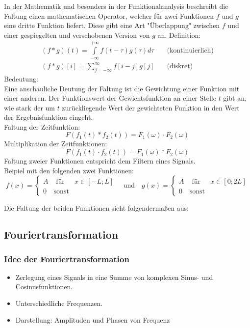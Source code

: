 In der Mathematik und besonders in der Funktionalanalysis beschreibt die Faltung einen mathematischen Operator, welcher für zwei Funktionen $f$ und $g$ eine dritte Funktion liefert. Diese gibt eine Art "{}Überlappung"{} zwischen $f$ und einer gespiegelten und verschobenen Version von $g$ an.
Definition: $$\begin{array}{cl} (f * g)(t) = \int\limits_{- \infty}^{+ \infty} f(t - \tau) g(\tau) d \tau & \quad \textrm{(kontinuierlich)} \\ (f * g)[i] = \sum\limits_{j = - \infty}^{\infty} f[i - j] g[j] & \quad \textrm{(diskret)} \end{array}$$
Bedeutung: \\
Eine anschauliche Deutung der Faltung ist die Gewichtung einer Funktion mit einer anderen. Der Funktionswert der Gewichtsfunktion an einer Stelle $t$ gibt an, wie stark der um $t$ zurückliegende Wert der gewichteten Funktion in den Wert der Ergebnisfunktion eingeht. \\
Faltung der Zeitfunktion: $$F(f_1(t) * f_2(t)) = F_1(\omega) \cdot F_2(\omega)$$
Multiplikation der Zeitfunktionen: $$F(f_1(t) \cdot f_2(t)) = F_1(\omega) * F_2(\omega)$$
Faltung zweier Funktionen entspricht dem Filtern eines Signals. \\[0,1cm]
Beipiel mit den folgenden zwei Funktionen:
$$f(x) = \left\{ \begin{array}{ccc} A & \textrm{ für } & x \in [-L;L] \\ 0 & \textrm{sonst} & \end{array} \right. \quad \textrm{und} \quad g(x) = \left\{ \begin{array}{ccc} A & \textrm{ für } & x \in [0;2L] \\ 0 & \textrm{sonst} & \end{array} \right.$$


Die Faltung der beiden Funktionen sieht folgendermaßen aus:


\subsection{Fouriertransformation}

\subsubsection*{Idee der Fouriertransformation}
\begin{itemize}
\item Zerlegung eines Signals in eine Summe von komplexen Sinus- und Cosinusfunktionen.
\item Unterschiedliche Frequenzen.
\item Darstellung: Amplituden und Phasen von Frequenz
\end{itemize}

